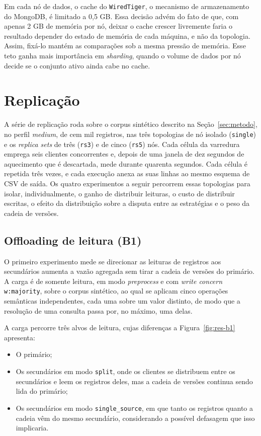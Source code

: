 Em cada nó de dados, o cache do \texttt{WiredTiger}, o mecanismo de armazenamento do MongoDB, é limitado a 0,5 GB. Essa decisão advém do fato de que, com apenas 2 GB de memória por nó, deixar o cache crescer livremente faria o resultado depender do estado de memória de cada máquina, e não da topologia. Assim, fixá-lo mantém as comparações sob a mesma pressão de memória. Esse teto ganha mais importância em \textit{sharding}, quando o volume de dados por nó decide se o conjunto ativo ainda cabe no cache.

\section{Replicação}
\label{sec:res-replicacao}

A série de replicação roda sobre o corpus sintético descrito na Seção~\ref{sec:metodo}, no perfil \textit{medium}, de cem mil registros, nas três topologias de nó isolado (\texttt{single}) e os \textit{replica sets} de três (\texttt{rs3}) e de cinco (\texttt{rs5}) nós. Cada célula da varredura emprega seis clientes concorrentes e, depois de uma janela de dez segundos de aquecimento que é descartada, mede durante quarenta segundos. Cada célula é repetida três vezes, e cada execução anexa as suas linhas ao mesmo esquema de CSV de saída. Os quatro experimentos a seguir percorrem essas topologias para isolar, individualmente, o ganho de distribuir leituras, o custo de distribuir escritas, o efeito da distribuição sobre a disputa entre as estratégias e o peso da cadeia de versões.

\subsection{Offloading de leitura (B1)}
\label{sec:res-b1}

O primeiro experimento mede se direcionar as leituras de registros aos secundários aumenta a vazão agregada sem tirar a cadeia de versões do primário. A carga é de somente leitura, em modo \textit{preprocess} e com \textit{write concern} \texttt{w:majority}, sobre o corpus sintético, ao qual se aplicam cinco operações semânticas independentes, cada uma sobre um valor distinto, de modo que a resolução de uma consulta passa por, no máximo, uma delas.

A carga percorre três alvos de leitura, cujas diferenças a Figura~\ref{fig:res-b1} apresenta: 
\begin{itemize}
    \item O primário;
    \item Os secundários em modo \texttt{split}, onde os clientes se distribuem entre os secundários e leem os registros deles, mas a cadeia de versões continua sendo lida do primário;
    \item Os secundários em modo \texttt{single\_source}, em que tanto os registros quanto a cadeia vêm do mesmo secundário, considerando a possível defasagem que isso implicaria.
\end{itemize}

